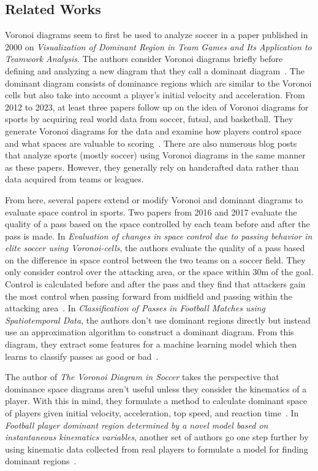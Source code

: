 \documentclass[11pt]{article}
\begin{document}
\subsection*{Related Works}
Voronoi diagrams seem to first be used to analyze soccer in a paper published in 2000 on \textit{Visualization of Dominant Region in Team Games and Its Application to Teamwork Analysis}.
The authors consider Voronoi diagrams briefly before defining and analyzing a new diagram that they call a dominant diagram~\cite{taki2000}. The dominant
diagram consists of dominance regions which are similar to the Voronoi cells but also take into account a player's initial velocity and acceleration.
From 2012 to 2023, at least three papers follow up on the idea of Voronoi diagrams for sports by acquiring real world data from soccer, futsal, and basketball.
They generate Voronoi diagrams for the data and examine how players control space and what spaces are valuable to scoring~\cite{Higgins_2023, FONSECA20121652, Bornn2016NBACR}.
There are also numerous blog posts that analyze sports (mostly soccer) using Voronoi diagrams in the same manner as these papers. However, they generally rely on handcrafted data rather
than data acquired from teams or leagues.

From here, several papers extend or modify Voronoi and dominant diagrams to evaluate space control in sports.
Two papers from 2016 and 2017 evaluate the quality of a pass based on the space controlled by each team before and after the pass is made.
In \textit{Evaluation of changes in space control due to passing behavior in elite soccer using Voronoi-cells}, the authors evaluate the quality of a pass based on the difference
in space control between the two teams on a soccer field. They only consider control over the attacking area, or the space within 30m of the goal. Control is calculated before
and after the pass and they find that attackers gain the most control when passing forward from midfield and passing within the attacking area~\cite{Rein2016}.
In \textit{Classification of Passes in Football Matches using Spatiotemporal Data}, the authors don't use dominant regions directly but instead use an approximation algorithm
to construct a dominant diagram. From this diagram, they extract some features for a machine learning model which then learns to classify passes as good or bad~\cite{Chawla_2017}.

The author of \textit{The Voronoi Diagram in Soccer} takes the perspective that dominance space diagrams aren't useful unless they consider the kinematics of a player. With this in mind,
they formulate a method to calculate dominant space of players given initial velocity, acceleration, top speed, and reaction time~\cite{efthimiou2022voronoi}.
In \textit{Football player dominant region determined by a novel model based on instantaneous kinematics variables}, another set of authors go one step further by using kinematic data collected
from real players to formulate a model for finding dominant regions~\cite{Caetano2021}.
\end{document}
